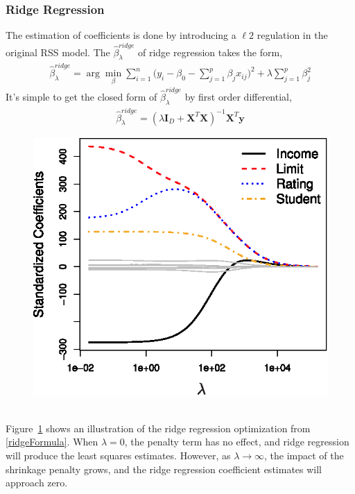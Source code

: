\documentclass[12pt,a4paper]{article}%
\theoremstyle{definition}
\theoremstyle{plain}
\numberwithin{equation}{section}
\begin{document}
\subsubsection{\textbf{Ridge Regression}}
The estimation of coefficients is done by introducing a $\ell 2$ regulation in the original RSS model. The $\hat{\beta}^{ridge}_{\lambda}$ of ridge regression takes the form, 
\begin{gather}
\hat{\beta}^{ridge}_{\lambda} = \arg\min_{\beta} \sum\limits_{i=1}^{n} \bigg( y_{i}-\beta_{0}- \sum\limits_{j=1}^{p}\beta_{j}x_{ij} \bigg)^{2} + \lambda \sum\limits_{j=1}^{p}\beta_{j}^{2}
\label{ridgeFormula}
\end{gather}
It's simple to get the closed form of $\hat{\beta}^{ridge}_{\lambda}$ by first order differential,
\begin{gather*}
\hat{\beta}^{ridge}_{\lambda} = (\lambda \mathbf{I}_{D} + \mathbf{X}^{T} \mathbf{X})^{-1} \mathbf{X}^{T} \mathbf{y}
\end{gather*}

\begin{figure}[H]
\centering
\includegraphics[scale=1]{images//6_4.eps}
\\~\\
\caption{ }\label{ridgeRegression}
\end{figure}

Figure~\ref{ridgeRegression} shows an illustration of the ridge regression optimization from \eqref{ridgeFormula}. When $\lambda=0$, the penalty term has no effect, and ridge regression will produce the least squares estimates. However, as $\lambda \rightarrow \infty$, the impact of the shrinkage penalty grows, and the ridge regression coefficient estimates will approach zero. 
\end{document}
